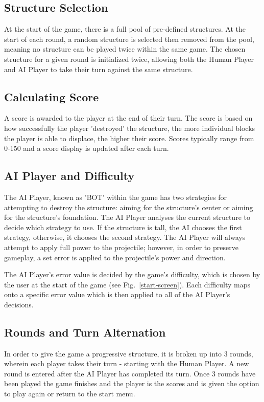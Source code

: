 \documentclass[runningheads]{llncs}
\begin{document}
	\subsection{Structure Selection}
	At the start of the game, there is a full pool of pre-defined structures. At the start of each round, a random structure is selected then removed from the pool, meaning no structure can be played twice within the same game. The chosen structure for a given round is initialized twice, allowing both the Human Player and AI Player to take their turn against the same structure.
	\subsection{Calculating Score}
	A score is awarded to the player at the end of their turn. The score is based on how successfully the player 'destroyed' the structure, the more individual blocks the player is able to displace, the higher their score. Scores typically range from 0-150 and a score display is updated after each turn.
	\subsection{AI Player and Difficulty}
	The AI Player, known as 'BOT' within the game has two strategies for attempting to destroy the structure: aiming for the structure's center or aiming for the structure's foundation. The AI Player analyses the current structure to decide which strategy to use. If the structure is tall, the AI chooses the first strategy, otherwise, it chooses the second strategy. The AI Player will always attempt to apply full power to the projectile; however, in order to preserve gameplay, a set error is applied to the projectile's power and direction. 
	
	The AI Player's error value is decided by the game's difficulty, which is chosen by the user at the start of the game (see Fig.~\ref{start-screen}). Each difficulty maps onto a specific error value which is then applied to all of the AI Player's decisions.

	\subsection{Rounds and Turn Alternation}
	In order to give the game a progressive structure, it is broken up into 3 rounds, wherein each player takes their turn - starting with the Human Player. A new round is entered after the AI Player has completed its turn. Once 3 rounds have been played the game finishes and the player is the scores and is given the option to play again or return to the start menu.
	
\end{document}
